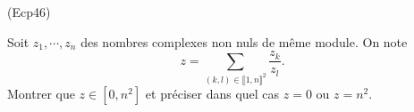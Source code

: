 \begin{tiny}(Ecp46)\end{tiny} Soit $z_1, \cdots, z_n$ des nombres complexes non nuls de même module. On note
\[
 z = \sum_{(k,l)\in \llbracket 1,n \rrbracket^2}\frac{z_k}{z_l}.
\]
Montrer que $z\in \left[ 0, n^2\right]$ et préciser dans quel cas $z=0$ ou $z=n^2$.